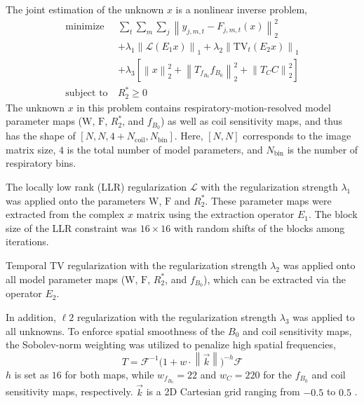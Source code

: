 \documentclass[journal,twoside,web]{ieeecolor}
\newcommand*{\norm}[1]{\left\lVert#1\right\rVert}
\begin{document}
The joint estimation of the unknown $x$ is a nonlinear inverse problem,
\begin{equation} \label{EQU:obj_func}
\begin{aligned}
\text{minimize}~& \sum_t \sum_m \sum_j \norm{y_{j,m,t} - F_{j,m,t}(x)}_2^2 \\
& + \lambda_1 \norm{\mathcal{L} (E_1 x)}_1 + \lambda_2 \norm{\text{TV}_t (E_2 x)}_1 \\
& + \lambda_3 [ \norm{x}_2^2 + \norm{T_{f_{B_0}} f_{B_0}}_2^2 + \norm{T_C C}_2^2 ]\\
\text{subject to}~& {R_2^*} \geq 0
\end{aligned}
\end{equation}
The unknown $x$ in this problem contains respiratory-motion-resolved 
model parameter maps ($\text{W}$,  $\text{F}$, $R_2^*$, and $f_{B_0}$) 
as well as coil sensitivity maps, and thus has the shape of 
$[N, N, 4 + N_\text{coil}, N_\text{bin}]$. 
Here, $[N, N]$ corresponds to the image matrix size, 
$4$ is the total number of model parameters, 
and $N_\text{bin}$ is the number of respiratory bins.

The locally low rank (LLR) regularization $\mathcal{L}$ with the regularization strength $\lambda_1$
was applied onto the parameters $\mathrm{W}$, $\mathrm{F}$ and $R_2^*$. 
These parameter maps were extracted from the complex $x$ matrix using the extraction operator $E_1$. 
The block size of the LLR constraint was $16 \times 16$ 
with random shifts of the blocks among iterations.

Temporal TV regularization \cite{feng_2014_grasp} 
with the regularization strength $\lambda_2$ was applied onto 
all model parameter maps ($\mathrm{W}$, $\mathrm{F}$, $R_2^*$, and $f_{B_0}$), 
which can be extracted via the operator $E_2$.

In addition, $\ell2$ regularization with the regularization strength $\lambda_3$ 
was applied to all unknowns. 
To enforce spatial smoothness of the $B_0$ and coil sensitivity maps, 
the Sobolev-norm weighting \cite{uecker_2008_nlinv} 
was utilized to penalize high spatial frequencies, 
\begin{equation}
	T = \mathcal{F}^{-1} \bigg(1 + w \cdot \norm{\vec{k}} \bigg)^{-h} \mathcal{F}
\end{equation}
$h$ is set as $16$ for both maps, 
while $w_{f_{B_0}} = 22$ and $w_{C} = 220$ for the $f_{B_0}$ and coil sensitivity maps, 
respectively. $\vec{k}$ is a 2D Cartesian grid ranging from $-0.5$ to $0.5$ 
\cite{tan_2019_mobawf}.
\end{document}
